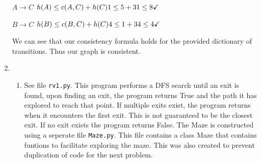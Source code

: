 \documentclass{article}
\begin{document}
\begin{enumerate}
\begin{multicols}{3}
\columnbreak

$A \rightarrow C$ \newline
$h(A) \le c(A,C) + h(C) \newline
1 \le 5 + 3 \newline
1 \le 8 \checkmark$ \newline

\columnbreak

$B \rightarrow C$ \newline
$h(B) \le c(B,C) + h(C) \newline
4 \le 1 + 3 \newline
4 \le 4 \checkmark$ \newline
\end{multicols}
We can see that our consistency formula holds for the provided dictionary of transitions.  Thus our graph is consistent.
  

\item 

\begin{enumerate}
\item See file \texttt{rv1.py}.  This program performs a DFS search until an exit is found, upon finding an exit, the program returns \textsf{True} and the path it has explored to reach that point.  If multiple exits exist, the program returns when it encounters the first exit.  This is not guaranteed to be the closest exit.  If no exit exists the program returns \textsf{False}.  The Maze is constructed using a seperate file \texttt{Maze.py}.  This file contains a class Maze that contains funtions to facilitate exploring the maze.  This was also created to prevent duplication of code for the next problem. 


\end{enumerate}
\end{enumerate}
\end{document}
